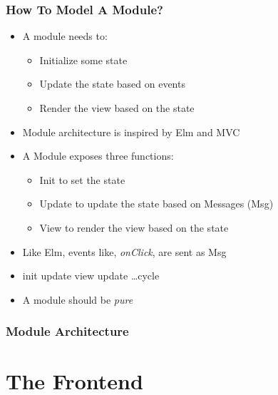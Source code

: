 \documentclass{beamer}
\begin{document}
\begin{frame}
  \frametitle{How To Model A Module?}
  \begin{itemize}
    \item A module needs to:
      \begin{itemize}
        \item Initialize some state
        \item Update the state based on events
        \item Render the view based on the state
      \end{itemize}
    \item Module architecture is inspired by Elm and MVC
    \item A Module exposes three functions:
      \begin{itemize}
        \item Init \textemdash to set the state
        \item Update \textemdash to update the state based on Messages (Msg)
        \item View \textemdash to render the view based on the state
      \end{itemize}
    \item Like Elm, events like, \textit{onClick}, are sent as Msg
    \item init \to update \to view \to update \to \dots cycle
    \item A module should be \textit{pure}
  \end{itemize}
\end{frame}

\begin{frame}
  \frametitle{Module Architecture}
  \centering
\end{frame}





\section{The Frontend}
\SectionPage
\end{document}
